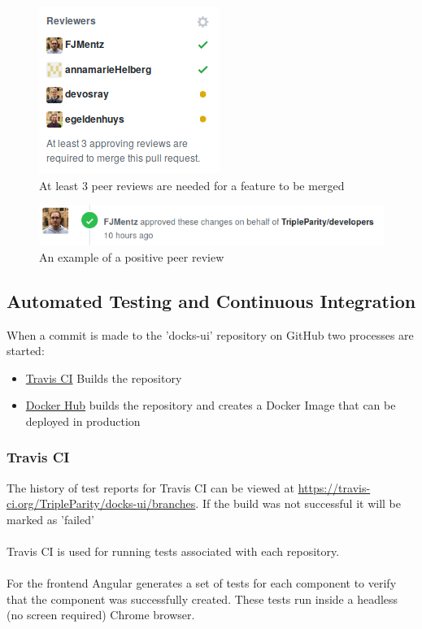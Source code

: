 \documentclass[]{article}
\begin{document}
\begin{figure}[H]
	\centering
	\includegraphics[scale=0.5]{github_3_reviews_required.png}
	\caption{At least 3 peer reviews are needed for a feature to be merged}
\end{figure}

\begin{figure}[H]
	\centering
	\includegraphics[scale=0.5]{github_approved_review.png}
	\caption{An example of a positive peer review}
\end{figure}

\subsection{Automated Testing and Continuous Integration}
When a commit is made to the 'docks-ui' repository on GitHub two
processes are started:
\begin{itemize}
	\item \href{https://travis-ci.org/TripleParity/docks-ui/branches}{Travis CI} Builds the repository
	\item \href{https://hub.docker.com/r/tripleparity/docks-ui/builds/}{Docker Hub} builds the repository and creates a Docker Image that can be deployed in production
\end{itemize}

\subsubsection{Travis CI}
The history of test reports for Travis CI can be viewed at \url{https://travis-ci.org/TripleParity/docks-ui/branches}.
If the build was not successful it will be marked as 'failed' \\
\\
Travis CI is used for running tests associated with each repository. \\
\\
For the frontend Angular generates a set of tests for each component to verify
that the component was successfully created. These tests run inside a
headless (no screen required) Chrome browser.
\end{document}
